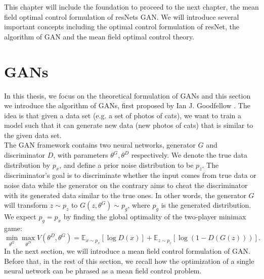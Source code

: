 This chapter will include the foundation to proceed to the next chapter, the mean field optimal control formulation of resNets GAN. We will introduce several important concepts including the optimal control formulation of resNet, the algorithm of GAN and the mean field optimal control theory.

\section{GANs}
In this thesis, we focus on the theoretical formulation of GANs and this section we introduce the algorithm of GANs, first proposed by Ian J. Goodfellow \cite[Theorem 1]{goodfellow2014generative}. The idea is that given a data set (e.g. a set of photos of cats), we want to train a model such that it can generate new data (new photos of cats) that is similar to the given data set.\\
The GAN framework contains two neural networks, generator $G$ and discriminator $D$, with parameters $\theta^G, \theta^D$ respectively. We denote the true data distribution by $p_x$, and define a prior noise distribution to be $p_z$. The discriminator's goal is to discriminate whether the input comes from true data or noise data while the generator on the contrary aims to cheat the discriminator with its generated data similar to the true ones. In other words, the generator $G$ will transform $z \sim p_z$ to $G(z, \theta^G) \sim p_g$, where $p_g$ is the generated distribution. We expect $p_g = p_x$ by finding the global optimality of the two-player minimax game: $$\min _{\theta^G} \max _{\theta^D} V(\theta^D, \theta^G)=\mathbb{E}_{x \sim p_{x}}[\log D(x)]+\mathbb{E}_{z \sim p_{z}}[\log (1-D(G(z)))].$$
In the next section, we will introduce a mean field control formulation of GAN. Before that, in the rest of this section, we recall how the optimization of a single neural network can be phrased as a mean field control problem.

